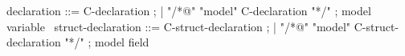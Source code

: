 \begin{syntax}
  declaration ::= C-declaration ;
  | { "/*@" "model" C-declaration "*/" } ; model variable
  \
  struct-declaration ::= C-struct-declaration ;
  | { "/*@" "model" C-struct-declaration "*/" } ; model field
\end{syntax}
